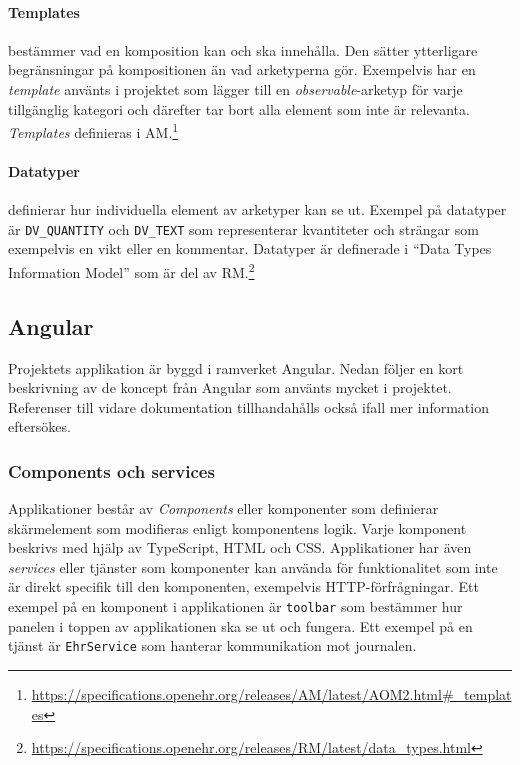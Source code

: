 \documentclass[techdoc/techdoc.tex]{subfiles}
\begin{document}
\paragraph{Templates} bestämmer vad en komposition kan och ska innehålla. Den
sätter ytterligare begränsningar på kompositionen än vad arketyperna gör.
Exempelvis har en \emph{template} använts i projektet som lägger till en
\emph{observable}-arketyp för varje tillgänglig kategori och därefter tar bort
alla element som inte är relevanta. \emph{Templates} definieras i AM.\footnote{
    \url{https://specifications.openehr.org/releases/AM/latest/AOM2.html\#_templates}
}

\paragraph{Datatyper} definierar hur individuella element av arketyper kan se
ut. Exempel på datatyper är \texttt{DV\_QUANTITY} och \texttt{DV\_TEXT} som
representerar kvantiteter och strängar som exempelvis en vikt eller en
kommentar. Datatyper är definerade i ``Data Types Information Model'' som är
del av RM.\footnote{
    \url{https://specifications.openehr.org/releases/RM/latest/data_types.html}
}


\subsection{Angular} \label{sec:ng}
Projektets applikation är byggd i ramverket Angular. Nedan följer en kort
beskrivning av de koncept från Angular som använts mycket i projektet.
Referenser till vidare dokumentation tillhandahålls också ifall mer information
eftersökes.


\subsubsection{Components och services}
Applikationer består av \emph{Components} eller komponenter som definierar
skärmelement som modifieras enligt komponentens logik. Varje komponent beskrivs
med hjälp av TypeScript, HTML och CSS. Applikationer har även \emph{services}
eller tjänster som komponenter kan använda för funktionalitet som inte är
direkt specifik till den komponenten, exempelvis HTTP-förfrågningar. Ett
exempel på en komponent i applikationen är \texttt{toolbar} som bestämmer hur
panelen i toppen av applikationen ska se ut och fungera. Ett exempel på en
tjänst är \texttt{EhrService} som hanterar kommunikation mot journalen.
\end{document}
